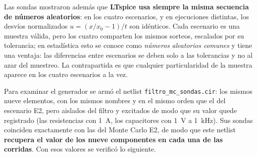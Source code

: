 Las sondas mostraron además que \textbf{LTspice usa siempre la misma secuencia de números aleatorios}: en los cuatro escenarios, y en ejecuciones
distintas, los desvíos normalizados $u = (x/x_0 - 1)/t$ son idénticos. Cada escenario es una muestra válida, pero los cuatro comparten los mismos
sorteos, escalados por su tolerancia; en estadística esto se conoce como \emph{números aleatorios comunes} y tiene una ventaja: las diferencias entre
escenarios se deben solo a las tolerancias y no al azar del muestreo. La contrapartida es que cualquier particularidad de la muestra aparece en los
cuatro escenarios a la vez.

Para examinar el generador se armó el netlist \texttt{filtro\_mc\_sondas.cir}: los mismos nueve elementos, con los mismos nombres y en el mismo orden
que el del escenario E2, pero aislados del filtro y excitados de modo que su valor quede registrado (las resistencias con \qty{1}{\ampere}, los
capacitores con \qty{1}{\volt} a \qty{1}{\kilo\hertz}). Sus sondas coinciden exactamente con las del Monte Carlo E2, de modo que este netlist
\textbf{recupera el valor de los nueve componentes en cada una de las \nNRun{} corridas}. Con esos valores se verificó lo siguiente.
